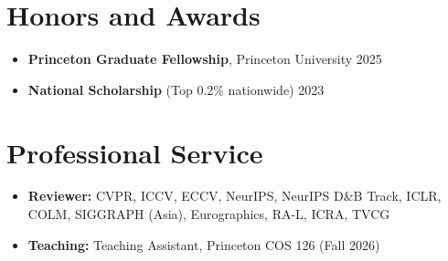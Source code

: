 \documentclass[letterpaper,11pt]{article}
\newlength{\gapItem}      \setlength{\gapItem}{-2pt}      %
\newlength{\gapList}      \setlength{\gapList}{-4pt}      %
\newcommand{\resumeItemListStart}{\begin{itemize}[leftmargin=0.15in]}
\newcommand{\resumeItemListEnd}{\end{itemize}\vspace{\gapList}}
\newcommand{\resumeItem}[1]{%
  \item\small{{#1 \vspace{\gapItem}}}
}
\begin{document}
\section{Honors and Awards}
\resumeItemListStart
    \resumeItem{\textbf{Princeton Graduate Fellowship}, Princeton University \hfill 2025}
    \resumeItem{\textbf{National Scholarship} (Top 0.2\% nationwide) \hfill 2023}
\resumeItemListEnd

\section{Professional Service}
\resumeItemListStart
    \resumeItem{\textbf{Reviewer:} CVPR, ICCV, ECCV, NeurIPS, NeurIPS D\&B Track, ICLR, COLM, SIGGRAPH (Asia), Eurographics, RA-L, ICRA, TVCG}
    \resumeItem{\textbf{Teaching:} Teaching Assistant, Princeton COS 126 (Fall 2026)}
\resumeItemListEnd

\end{document}
